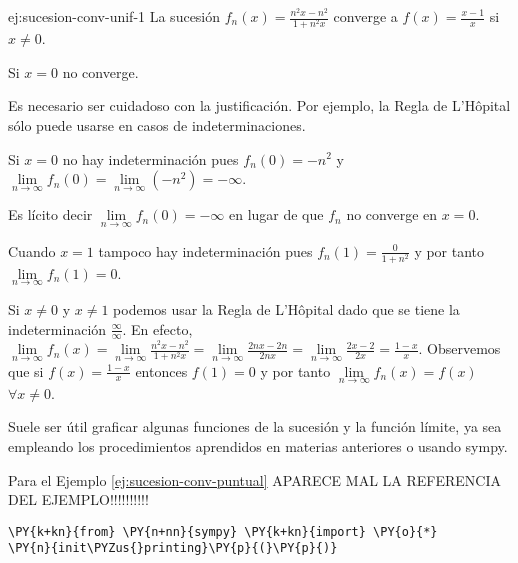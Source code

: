 \begin{ejemplo}{ej:sucesion-conv-unif-1}
La sucesión $f_n(x)=\frac{n^2x-n^2}{1+n^2x}$ converge a $f(x)=\frac{x-1}{x}$ si $x \neq 0$.

Si $x=0$ no converge.

Es necesario ser cuidadoso con la justificación. Por ejemplo, la Regla de L'H\^opital  sólo puede usarse en casos de indeterminaciones.

Si $x=0$ no hay indeterminación pues $f_n(0)=-n^2 $ y 
$\lim\limits_{n \to \infty}f_n(0)=\lim\limits_{n \to \infty}(-n^2)=-\infty$. 

Es lícito decir $\lim\limits_{n \to \infty}f_n(0)=-\infty$ en lugar de que $f_n$ no converge en $x=0$.

Cuando $x=1$ tampoco hay indeterminación pues $f_n(1)=\frac{0}{1+n^2}$ y por tanto $\lim\limits_{n \to \infty} f_n(1)=0$. 
 
Si $x\neq 0$ y $x \neq 1$ podemos usar la Regla de L'H\^opital dado que se tiene la indeterminación $\frac{\infty}{\infty}$. 
En efecto, 
$\lim\limits_{n \to \infty}f_n(x)=
\lim\limits_{n \to \infty}\frac{n^2x-n^2}{1+n^2x}=
\lim\limits_{n \to \infty}\frac{2nx-2n}{2nx}=
\lim\limits_{n \to \infty}\frac{2x-2}{2x}=\frac{1-x}{x}.
$
Observemos que si $f(x)=\frac{1-x}{x}$ entonces $f(1)=0$ y por tanto $\lim\limits_{n\to \infty}f_n(x)=f(x)$ $\forall x\neq 0$.

Suele ser útil graficar algunas funciones de la sucesión y la función límite, ya sea empleando los procedimientos aprendidos 
en materias anteriores o usando sympy.
\end{ejemplo}

Para el Ejemplo \ref{ej:sucesion-conv-puntual} APARECE MAL LA REFERENCIA DEL EJEMPLO!!!!!!!!!!

 \begin{tcolorbox}[breakable, size=fbox, boxrule=1pt, pad at break*=1mm,colback=cellbackground, colframe=cellborder]
\begin{Verbatim}[commandchars=\\\{\}]
\PY{k+kn}{from} \PY{n+nn}{sympy} \PY{k+kn}{import} \PY{o}{*}
\PY{n}{init\PYZus{}printing}\PY{p}{(}\PY{p}{)}
\end{Verbatim}
\end{tcolorbox}


